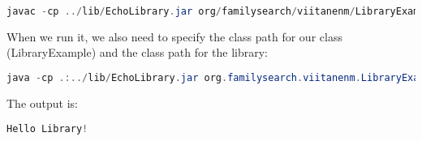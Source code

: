 \begin{lstlisting}[language=Java]
javac -cp ../lib/EchoLibrary.jar org/familysearch/viitanenm/LibraryExample.java 
\end{lstlisting}

When we run it, we also need to specify the class path for our class (LibraryExample) and the class path for the library:
\begin{lstlisting}[language=Java]
java -cp .:../lib/EchoLibrary.jar org.familysearch.viitanenm.LibraryExample
\end{lstlisting}

The output is:
\begin{lstlisting}[language=Java]
Hello Library!
\end{lstlisting}
